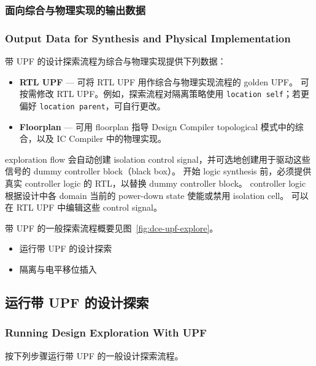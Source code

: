 \subsubsection{面向综合与物理实现的输出数据}
\subsubsection*{Output Data for Synthesis and Physical Implementation}

带 UPF 的设计探索流程为综合与物理实现提供下列数据：
\begin{itemize}
  \item \textbf{RTL UPF} — 可将 RTL UPF 用作综合与物理实现流程的 golden UPF。
        可按需修改 RTL UPF。例如，探索流程对隔离策略使用 \texttt{location self}；若更偏好 \texttt{location parent}，可自行更改。
  \item \textbf{Floorplan} — 可用 floorplan 指导 Design Compiler topological 模式中的综合，以及 IC Compiler 中的物理实现。
\end{itemize}

exploration flow 会自动创建 isolation control signal，并可选地创建用于驱动这些信号的 dummy controller block（black box）。
开始 logic synthesis 前，必须提供真实 controller logic 的 RTL，以替换 dummy controller block。
controller logic 根据设计中各 domain 当前的 power-down state 使能或禁用 isolation cell。
可以在 RTL UPF 中编辑这些 control signal。

带 UPF 的一般探索流程概要见图~\ref{fig:dce-upf-explore}。


\begin{seeAlsoBox}
\begin{itemize}
  \item 运行带 UPF 的设计探索
  \item 隔离与电平移位插入
\end{itemize}
\end{seeAlsoBox}

\subsection{运行带 UPF 的设计探索}
\subsubsection*{Running Design Exploration With UPF}

按下列步骤运行带 UPF 的一般设计探索流程。

